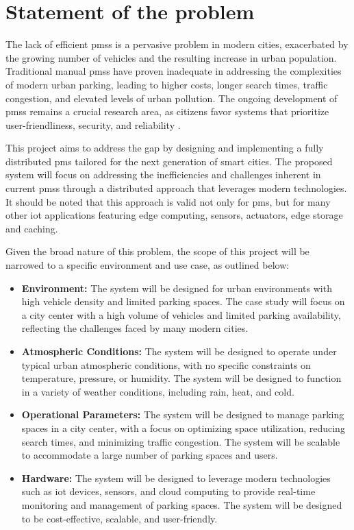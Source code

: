 \chapter{Statement of the problem}\label{ch:statement_of_problem}

The lack of efficient \glspl{pms} is a pervasive problem in modern cities, exacerbated by the growing number of vehicles and the resulting increase in urban population. Traditional manual \glspl{pms} have proven inadequate in addressing the complexities of modern urban parking, leading to higher costs, longer search times, traffic congestion, and elevated levels of urban pollution. The ongoing development of \glspl{pms} remains a crucial research area, as citizens favor systems that prioritize user-friendliness, security, and reliability \autocite{parking_choices} \autocite{A_Elsonbaty_2020} \autocite{intelligent_parking_system} \autocite{smart_parking_management_system}.

This project aims to address the gap by designing and implementing a fully distributed \gls{pms} tailored for the next generation of smart cities. The proposed system will focus on addressing the inefficiencies and challenges inherent in current \glspl{pms} through a distributed approach that leverages modern technologies. It should be noted that this approach is valid not only for \gls{pms}, but for many other \gls{iot} applications featuring edge computing, sensors, actuators, edge storage and caching.

Given the broad nature of this problem, the scope of this project will be narrowed to a specific environment and use case, as outlined below:

\begin{itemize}
    \item \textbf{Environment:} The system will be designed for urban environments with high vehicle density and limited parking spaces. The case study will focus on a city center with a high volume of vehicles and limited parking availability, reflecting the challenges faced by many modern cities.

    \item \textbf{Atmospheric Conditions:} The system will be designed to operate under typical urban atmospheric conditions, with no specific constraints on temperature, pressure, or humidity. The system will be designed to function in a variety of weather conditions, including rain, heat, and cold.

    \item \textbf{Operational Parameters:} The system will be designed to manage parking spaces in a city center, with a focus on optimizing space utilization, reducing search times, and minimizing traffic congestion. The system will be scalable to accommodate a large number of parking spaces and users.

    \item \textbf{Hardware:} The system will be designed to leverage modern technologies such as \gls{iot} devices, sensors, and cloud computing to provide real-time monitoring and management of parking spaces. The system will be designed to be cost-effective, scalable, and user-friendly.
\end{itemize}
